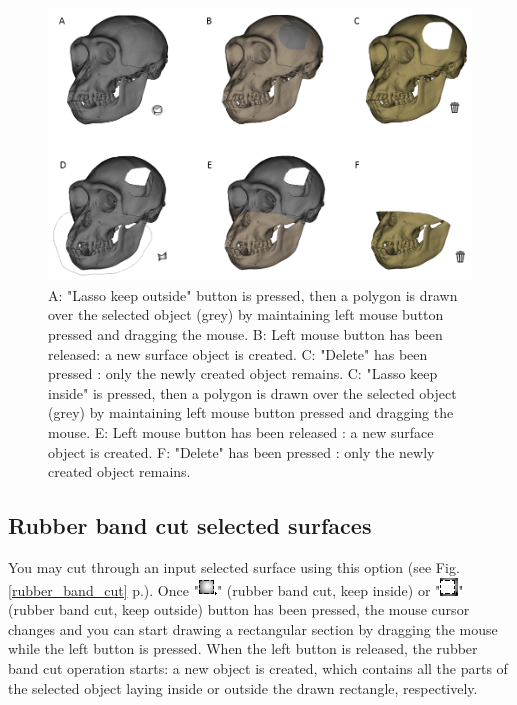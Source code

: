 \begin{figure}
  \centering
  \includegraphics[scale=0.6]{images/06/objects/lasso_cut.png} 
	\caption{A: "Lasso keep outside" button is pressed, then a polygon is drawn over the selected object (grey) by maintaining left mouse button pressed and dragging the mouse. B: Left mouse button has been released: a new surface object is  created. C: "Delete" has been pressed : only the newly created  object remains. C: "Lasso keep inside" is pressed, then a polygon is drawn over the selected object (grey) by maintaining left mouse button pressed and dragging the mouse. E: Left mouse button has been released : a new surface object is  created. F: "Delete" has been pressed : only the newly created  object remains. }
\label{lasso_cut}
 
\end{figure}

\subsection{Rubber band cut selected surfaces} \label{rubber_band_cut_section}

You may cut through an input selected surface using this option (see Fig. \ref{rubber_band_cut} p.\pageref{rubber_band_cut}). Once "\includegraphics[scale=0.7]{images/06/objects/rubber_mode_keepinside.png}" (rubber band cut, keep inside) or "\includegraphics[scale=0.7]{images/06/objects/rubber_mode_keepoutside.png}" (rubber band cut, keep outside) button has been pressed, the mouse cursor changes and you can start drawing a rectangular section by dragging the mouse while the left button is pressed. When the left button is released, the rubber band cut operation starts: a new object is created, which contains all the parts of the selected object laying inside or outside the drawn rectangle, respectively.\\

